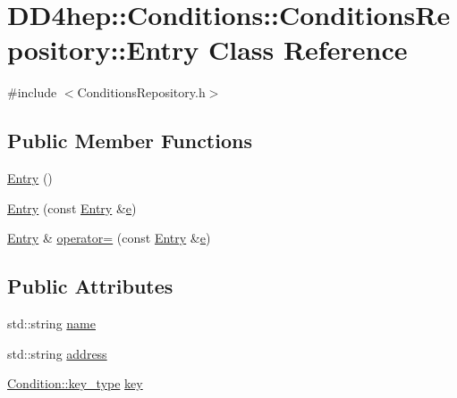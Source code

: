 \hypertarget{class_d_d4hep_1_1_conditions_1_1_conditions_repository_1_1_entry}{}\section{D\+D4hep\+:\+:Conditions\+:\+:Conditions\+Repository\+:\+:Entry Class Reference}
\label{class_d_d4hep_1_1_conditions_1_1_conditions_repository_1_1_entry}


{\ttfamily \#include $<$Conditions\+Repository.\+h$>$}

\subsection*{Public Member Functions}
\begin{DoxyCompactItemize}
\item 
\hyperlink{class_d_d4hep_1_1_conditions_1_1_conditions_repository_1_1_entry_a4b5b7b66f05263698a5f95afacf50c2d}{Entry} ()
\item 
\hyperlink{class_d_d4hep_1_1_conditions_1_1_conditions_repository_1_1_entry_ae83cae74d588480e3e142c54fb198dc5}{Entry} (const \hyperlink{class_d_d4hep_1_1_conditions_1_1_conditions_repository_1_1_entry}{Entry} \&\hyperlink{_volumes_8cpp_a8a9a1f93e9b09afccaec215310e64142}{e})
\item 
\hyperlink{class_d_d4hep_1_1_conditions_1_1_conditions_repository_1_1_entry}{Entry} \& \hyperlink{class_d_d4hep_1_1_conditions_1_1_conditions_repository_1_1_entry_a6d1dd37eaf5e954821998aaa3daa42a3}{operator=} (const \hyperlink{class_d_d4hep_1_1_conditions_1_1_conditions_repository_1_1_entry}{Entry} \&\hyperlink{_volumes_8cpp_a8a9a1f93e9b09afccaec215310e64142}{e})
\end{DoxyCompactItemize}
\subsection*{Public Attributes}
\begin{DoxyCompactItemize}
\item 
std\+::string \hyperlink{class_d_d4hep_1_1_conditions_1_1_conditions_repository_1_1_entry_a72388605da0e0b2ec2bafa344776f967}{name}
\item 
std\+::string \hyperlink{class_d_d4hep_1_1_conditions_1_1_conditions_repository_1_1_entry_a6a105e657ab13c08b36b5e0e5be73deb}{address}
\item 
\hyperlink{class_d_d4hep_1_1_conditions_1_1_condition_a7528efa762e8cc072ef80ea67c3531f9}{Condition\+::key\+\_\+type} \hyperlink{class_d_d4hep_1_1_conditions_1_1_conditions_repository_1_1_entry_a2dff42077683b05077ecebdd3f4e1e0d}{key}
\end{DoxyCompactItemize}


